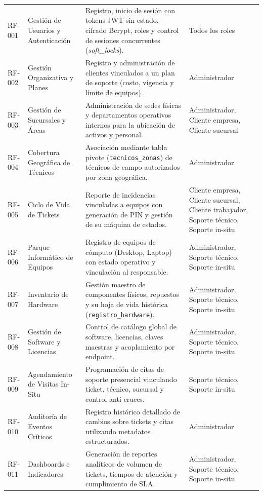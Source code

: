 \begin{longtable}{@{} >{\raggedright\arraybackslash}p{1.6cm} >{\raggedright\arraybackslash}p{2.9cm} >{\raggedright\arraybackslash}p{6.5cm} >{\raggedright\arraybackslash}p{3.8cm} @{}}
RF-001 & Gestión de Usuarios y Autenticación & Registro, inicio de sesión con tokens JWT sin estado, cifrado Bcrypt, roles y control de sesiones concurrentes (\textit{soft\_locks}). & Todos los roles \\
RF-002 & Gestión Organizativa y Planes & Registro y administración de clientes vinculados a un plan de soporte (costo, vigencia y límite de equipos). & Administrador \\
RF-003 & Gestión de Sucursales y Áreas & Administración de sedes físicas y departamentos operativos internos para la ubicación de activos y personal. & Administrador, Cliente empresa, Cliente sucursal \\
RF-004 & Cobertura Geográfica de Técnicos & Asociación mediante tabla pivote (\texttt{tecnicos\_zonas}) de técnicos de campo autorizados por zona geográfica. & Administrador \\
RF-005 & Ciclo de Vida de Tickets & Reporte de incidencias vinculadas a equipos con generación de PIN y gestión de su máquina de estados. & Cliente empresa, Cliente sucursal, Cliente trabajador, Soporte técnico, Soporte in-situ \\
RF-006 & Parque Informático de Equipos & Registro de equipos de cómputo (Desktop, Laptop) con estado operativo y vinculación al responsable. & Administrador, Soporte técnico, Soporte in-situ \\
RF-007 & Inventario de Hardware & Gestión maestro de componentes físicos, repuestos y su hoja de vida histórica (\texttt{registro\_hardware}). & Administrador, Soporte técnico, Soporte in-situ \\
RF-008 & Gestión de Software y Licencias & Control de catálogo global de software, licencias, claves maestras y acoplamiento por endpoint. & Administrador, Soporte técnico, Soporte in-situ \\
RF-009 & Agendamiento de Visitas In-Situ & Programación de citas de soporte presencial vinculando ticket, técnico, sucursal y control anti-cruces. & Soporte técnico, Soporte in-situ \\
RF-010 & Auditoría de Eventos Críticos & Registro histórico detallado de cambios sobre tickets y citas utilizando metadatos estructurados. & Administrador \\
RF-011 & Dashboards e Indicadores & Generación de reportes analíticos de volumen de tickets, tiempos de atención y cumplimiento de SLA. & Administrador, Soporte técnico, Soporte in-situ \\
\end{longtable}
\endgroup

